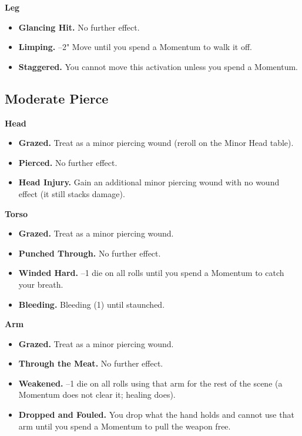 \textbf{Leg}
\begin{itemize}
    \item[1--2] \textbf{Glancing Hit.} No further effect.
    \item[3] \textbf{Limping.} --2" Move until you spend a Momentum to walk it off.
    \item[4] \textbf{Staggered.} You cannot move this activation unless you spend a Momentum.
\end{itemize}

\subsection{Moderate Pierce}

\textbf{Head}
\begin{itemize}
    \item[1] \textbf{Grazed.} Treat as a minor piercing wound (reroll on the Minor Head table).
    \item[2] \textbf{Pierced.} No further effect.
    \item[3--4] \textbf{Head Injury.} Gain an additional minor piercing wound with no wound effect (it still stacks damage).
\end{itemize}

\textbf{Torso}
\begin{itemize}
    \item[1] \textbf{Grazed.} Treat as a minor piercing wound.
    \item[2] \textbf{Punched Through.} No further effect.
    \item[3] \textbf{Winded Hard.} --1 die on all rolls until you spend a Momentum to catch your breath.
    \item[4] \textbf{Bleeding.} Bleeding (1) until staunched.
\end{itemize}

\textbf{Arm}
\begin{itemize}
    \item[1] \textbf{Grazed.} Treat as a minor piercing wound.
    \item[2] \textbf{Through the Meat.} No further effect.
    \item[3] \textbf{Weakened.} --1 die on all rolls using that arm for the rest of the scene (a Momentum does not clear it; healing does).
    \item[4] \textbf{Dropped and Fouled.} You drop what the hand holds and cannot use that arm until you spend a Momentum to pull the weapon free.
\end{itemize}

